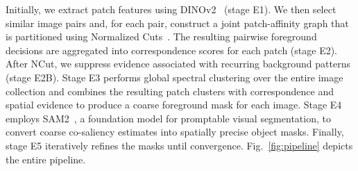 Initially, we extract patch features using DINOv2~\cite{oquab2023dinov2} (stage E1). We then select similar image pairs and, for each pair, construct a joint patch-affinity graph that is partitioned using Normalized Cuts~\cite{shi2000normalized}. The resulting pairwise foreground decisions are aggregated into correspondence scores for each patch (stage E2). After NCut, we suppress evidence associated with recurring background patterns (stage E2B). Stage E3 performs global spectral clustering over the entire image collection and combines the resulting patch clusters with correspondence and spatial evidence to produce a coarse foreground mask for each image. Stage E4 employs SAM2~\cite{ravi2024sam2}, a foundation model for promptable visual segmentation, to convert coarse co-saliency estimates into spatially precise object masks. Finally, stage E5 iteratively refines the masks until convergence. Fig.~\ref{fig:pipeline} depicts the entire pipeline.
